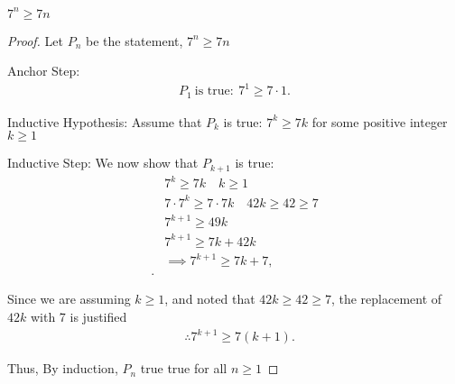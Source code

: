 \documentclass{report}
\begin{document}
    \pagebreak \bigbreak \noindent 
    \begin{prop}
       $7^{n} \geq 7n$ 
    \end{prop}
    \bigbreak \noindent 
    \begin{proof}
        Let $P_{n}$ be the statement, $7^{n} \geq 7n$
        \bigbreak \noindent 

        Anchor Step:
        \begin{align*}
            P_{1}\ \text{is true}:\ 7^{1} \geq 7\cdot 1
        .\end{align*}
        \bigbreak \noindent 

        Inductive Hypothesis: Assume that $P_{k}$ is true: $7^{k} \geq7k$ for some positive integer $k \geq1 $
        \bigbreak \noindent 

        Inductive Step: We now show that $P_{k+1}$ is true:
        \begin{align*}
            &7^{k} \geq7k \quad k \geq1 \\
            &7 \cdot 7^{k} \geq 7 \cdot 7k \quad 42k \geq 42 \geq 7 \\
            &7^{k+1} \geq 49k \\
            &7^{k+1} \geq 7k + 42k \\
            &\implies 7^{k+1} \geq 7k + 7,\ \\
        .\end{align*}

         Since we are assuming $k \geq 1$, and noted that $42k \geq 42 \geq 7$, the replacement of $42k$ with 7 is justified 
         \begin{align*}
            &\therefore7^{k+1} \geq7(k+1)
         .\end{align*}
        \bigbreak \noindent 
        
        Thus, By induction, $P_{n}$ true true for all $n \geq1 $

    \end{proof}

    
    
    
    
    
    
    
    
        
    



    
    
    


    
    
    
    
    
    
    
    
    



    
    

    

    










    
    
\end{document}
